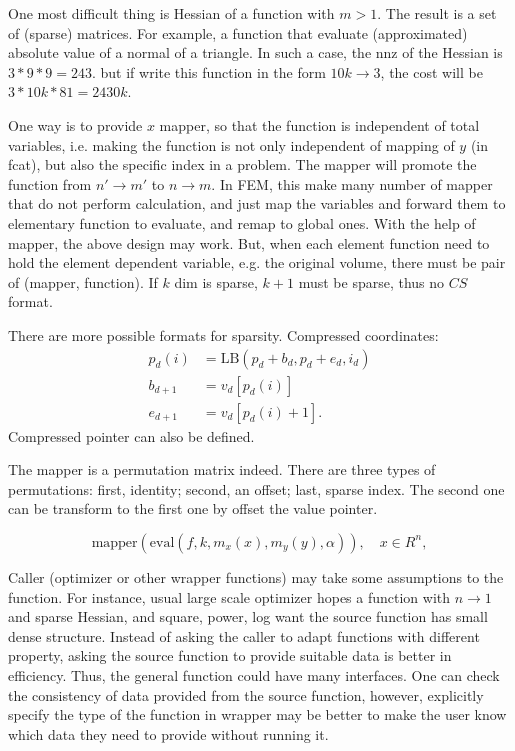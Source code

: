 \documentclass[9pt,twocolumn]{extarticle}
\begin{document}
One most difficult thing is Hessian of a function with $m>1$. The
result is a set of (sparse) matrices.  For example, a function that
evaluate (approximated) absolute value of a normal of a triangle.  In
such a case, the nnz of the Hessian is $3*9*9=243$. but if write this
function in the form $10k \rightarrow 3$, the cost will be
$3*10k*81=2430k$.

One way is to provide $x$ mapper, so that the function is independent
of total variables, i.e. making the function is not only independent
of mapping of $y$ (in fcat), but also the specific index in a problem.
The mapper will promote the function from $n' \rightarrow m'$ to $n
\rightarrow m$.  In FEM, this make many number of mapper that do not
perform calculation, and just map the variables and forward them to
elementary function to evaluate, and remap to global ones.  With the
help of mapper, the above design may work.  But, when each element
function need to hold the element dependent variable, e.g. the
original volume, there must be pair of (mapper, function).  If $k$ dim
is sparse, $k+1$ must be sparse, thus no $CS$ format.

There are more possible formats for sparsity. Compressed coordinates:
\begin{equation}
  \begin{split}
    p_d(i) &= \mbox{LB}(p_d + b_d, p_d + e_d, i_d)\\
    b_{d+1} &= v_d[p_d(i)]\\
    e_{d+1} &= v_d[p_d(i)+1].
  \end{split}
\end{equation}
Compressed pointer can also be defined.

The mapper is a permutation matrix indeed.  There are three types of
permutations: first, identity; second, an offset; last, sparse index.
The second one can be transform to the first one by offset the value
pointer.


\begin{equation}
  \mbox{mapper}(\mbox{eval}(f, k, m_x(x), m_y(y), \alpha)), \quad x \in R^n,
\end{equation}

Caller (optimizer or other wrapper functions) may take some
assumptions to the function.  For instance, usual large scale
optimizer hopes a function with $n\rightarrow 1$ and sparse Hessian,
and square, power, log want the source function has small dense
structure. Instead of asking the caller to adapt functions with
different property, asking the source function to provide suitable
data is better in efficiency.  Thus, the general function could have
many interfaces.  One can check the consistency of data provided from
the source function, however, explicitly specify the type of the
function in wrapper may be better to make the user know which data
they need to provide without running it.
\end{document}
